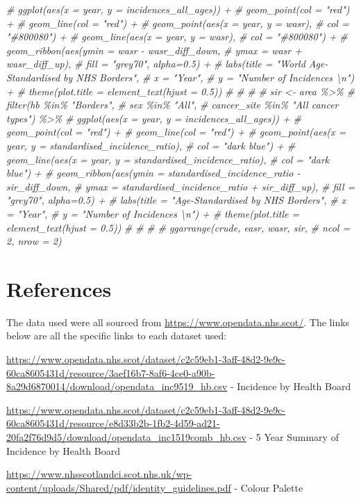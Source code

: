 \documentclass[
]{article}
\newenvironment{Shaded}{\begin{snugshade}}{\end{snugshade}}
\newcommand{\CommentTok}[1]{\textcolor[rgb]{0.56,0.35,0.01}{\textit{#1}}}
\begin{document}
\begin{Shaded}
\begin{Highlighting}[]
\CommentTok{\#   ggplot(aes(x = year, y = incidences\_all\_ages)) +}
\CommentTok{\#   geom\_point(col = "red") +}
\CommentTok{\#   geom\_line(col = "red") +}
\CommentTok{\#   geom\_point(aes(x = year, y = wasr),}
\CommentTok{\#              col = "\#800080") +}
\CommentTok{\#   geom\_line(aes(x = year, y = wasr),}
\CommentTok{\#             col = "\#800080") +}
\CommentTok{\#   geom\_ribbon(aes(ymin = wasr {-} wasr\_diff\_down, }
\CommentTok{\#                   ymax = wasr + wasr\_diff\_up), }
\CommentTok{\#               fill = "grey70", alpha=0.5) +}
\CommentTok{\#   labs(title = "World Age{-}Standardised by NHS Borders",}
\CommentTok{\#        x = "Year",}
\CommentTok{\#        y = "Number of Incidences \textbackslash{}n") +}
\CommentTok{\#   theme(plot.title = element\_text(hjust = 0.5))}
\CommentTok{\# }
\CommentTok{\# }
\CommentTok{\# }
\CommentTok{\# sir \textless{}{-} area \%\textgreater{}\% }
\CommentTok{\#   filter(hb \%in\% "Borders",}
\CommentTok{\#          sex \%in\% "All",}
\CommentTok{\#          cancer\_site \%in\% "All cancer types") \%\textgreater{}\% }
\CommentTok{\#   ggplot(aes(x = year, y = incidences\_all\_ages)) +}
\CommentTok{\#   geom\_point(col = "red") +}
\CommentTok{\#   geom\_line(col = "red") +}
\CommentTok{\#   geom\_point(aes(x = year, y = standardised\_incidence\_ratio),}
\CommentTok{\#              col = "dark blue") +}
\CommentTok{\#   geom\_line(aes(x = year, y = standardised\_incidence\_ratio),}
\CommentTok{\#             col = "dark blue") +}
\CommentTok{\#   geom\_ribbon(aes(ymin = standardised\_incidence\_ratio {-} sir\_diff\_down, }
\CommentTok{\#                   ymax = standardised\_incidence\_ratio + sir\_diff\_up), }
\CommentTok{\#               fill = "grey70", alpha=0.5) +}
\CommentTok{\#   labs(title = "Age{-}Standardised by NHS Borders",}
\CommentTok{\#        x = "Year",}
\CommentTok{\#        y = "Number of Incidences \textbackslash{}n") +}
\CommentTok{\#   theme(plot.title = element\_text(hjust = 0.5))}
\CommentTok{\# }
\CommentTok{\# }
\CommentTok{\# }
\CommentTok{\# ggarrange(crude, easr, wasr, sir,}
\CommentTok{\#           ncol = 2, nrow = 2)}
\end{Highlighting}
\end{Shaded}

\hypertarget{references}{%
\section{References}\label{references}}

The data used were all sourced from
\url{https://www.opendata.nhs.scot/}. The links below are all the
specific links to each dataset used:

\url{https://www.opendata.nhs.scot/dataset/c2c59eb1-3aff-48d2-9e9c-60ca8605431d/resource/3aef16b7-8af6-4ce0-a90b-8a29d6870014/download/opendata_inc9519_hb.csv}
- Incidence by Health Board

\url{https://www.opendata.nhs.scot/dataset/c2c59eb1-3aff-48d2-9e9c-60ca8605431d/resource/e8d33b2b-1fb2-4d59-ad21-20fa2f76d9d5/download/opendata_inc1519comb_hb.csv}
- 5 Year Summary of Incidence by Health Board

\url{https://www.nhsscotlandci.scot.nhs.uk/wp-content/uploads/Shared/pdf/identity_guidelines.pdf}
- Colour Palette
\end{document}
